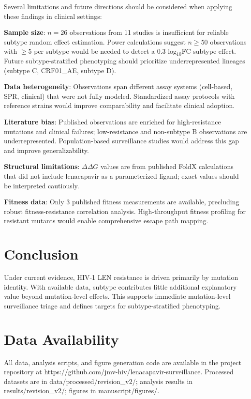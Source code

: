 \documentclass[12pt,a4paper]{article}
\begin{document}
Several limitations and future directions should be considered when applying these findings in clinical settings:

\textbf{Sample size}: $n=26$ observations from 11 studies is insufficient for reliable subtype random effect estimation. Power calculations suggest $n \geq 50$ observations with $\geq 5$ per subtype would be needed to detect a 0.3 log$_{10}$FC subtype effect. Future subtype-stratified phenotyping should prioritize underrepresented lineages (subtype C, CRF01\_AE, subtype D).

\textbf{Data heterogeneity}: Observations span different assay systems (cell-based, SPR, clinical) that were not fully modeled. Standardized assay protocols with reference strains would improve comparability and facilitate clinical adoption.

\textbf{Literature bias}: Published observations are enriched for high-resistance mutations and clinical failures; low-resistance and non-subtype B observations are underrepresented. Population-based surveillance studies would address this gap and improve generalizability.

\textbf{Structural limitations}: $\Delta\Delta G$ values are from published FoldX calculations that did not include lenacapavir as a parameterized ligand; exact values should be interpreted cautiously.

\textbf{Fitness data}: Only 3 published fitness measurements are available, precluding robust fitness-resistance correlation analysis. High-throughput fitness profiling for resistant mutants would enable comprehensive escape path mapping.

\section{Conclusion}

Under current evidence, HIV-1 LEN resistance is driven primarily by mutation identity. With available data, subtype contributes little additional explanatory value beyond mutation-level effects. This supports immediate mutation-level surveillance triage and defines targets for subtype-stratified phenotyping.

\section*{Data Availability}
All data, analysis scripts, and figure generation code are available in the project repository at https://github.com/jmv-hiv/lenacapavir-surveillance. Processed datasets are in data/processed/revision\_v2/; analysis results in results/revision\_v2/; figures in manuscript/figures/.
\end{document}
